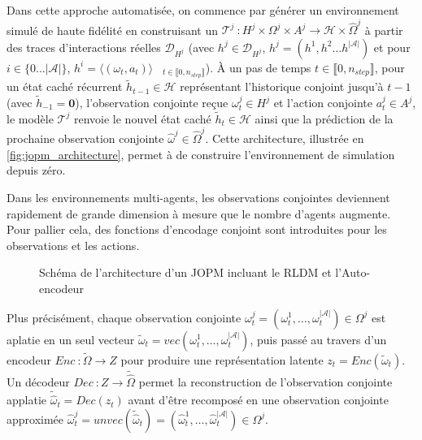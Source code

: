 Dans cette approche automatisée, on commence par générer un environnement simulé de haute fidélité en construisant un  $\mathcal{T}^j~: H^j \times \Omega^j \times A^j \rightarrow \mathcal{H} \times \hat{\Omega}^j$ à partir des traces d'interactions réelles $\mathcal{D}_{H^j}$ (avec $h^j \in \mathcal{D}_{H^j}$, $h^j = (h^1, h^2 \dots h^{|\mathcal{A}|})$ et pour $i \in \{0\dots|\mathcal{A}|\}$, $h^i = \langle (\omega_t, a_t) \rangle\phantom{X}_{t \in \llbracket 0, n_{step} \rrbracket}$). À un pas de temps $t \in \llbracket 0, n_{step} \rrbracket$, pour un état caché récurrent $\tilde{h}_{t-1} \in \mathcal{H}$ représentant l'historique conjoint jusqu'à $t-1$ (avec $\tilde{h}_{-1} = \mathbf{0}$), l'observation conjointe reçue $\omega_t^j \in H^j$ et l'action conjointe $a_t^j \in A^j$, le modèle $\mathcal{T}^j$ renvoie le nouvel état caché $\tilde{h}_t \in \mathcal{H}$ ainsi que la prédiction de la prochaine observation conjointe $\hat{\omega}^j \in \hat{\Omega}^j$. Cette architecture, illustrée en \autoref{fig:jopm_architecture}, permet à  de construire l'environnement de simulation depuis zéro.

Dans les environnements multi-agents, les observations conjointes deviennent rapidement de grande dimension à mesure que le nombre d'agents augmente. Pour pallier cela, des fonctions d'encodage conjoint sont introduites pour les observations et les actions.

\begin{figure}[h]
  \centering
  \resizebox{\textwidth}{!}{%
    
  }
  \caption{Schéma de l'architecture d'un JOPM incluant le RLDM et l'Auto-encodeur}
  \label{fig:jopm_architecture}
\end{figure}


Plus précisément, chaque observation conjointe $\omega_t^{j} = (\omega_t^1, \dots, \omega_t^{|\mathcal{A}|}) \in \Omega^{j}$ est aplatie en un seul vecteur $\tilde{\omega}_t = vec(\omega_t^1, \dots, \omega_t^{|\mathcal{A}|})$, puis passé au travers d'un encodeur $Enc~: \tilde{\Omega}\rightarrow Z$ pour produire une représentation latente $z_t = Enc(\tilde{\omega}_t)$. Un décodeur $Dec~: Z \rightarrow \widetilde{\hat{\Omega}}$ permet la reconstruction de l'observation conjointe applatie $\widetilde{\hat{\omega}}_t = Dec(z_t)$ avant d'être recomposé en une observation conjointe approximée $\hat{\omega}_t^{j} = unvec(\widetilde{\hat{\omega}}_t) = (\hat{\omega}_t^1, \dots, \hat{\omega}_t^{|\mathcal{A}|}) \in \Omega^{j}$.

